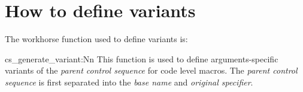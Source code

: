 \section{How to define variants}

The workhorse function used to define variants is:

\begin{docCommand}{cs_generate_variant:Nn} {  }
This function is used to define arguments-specific variants of the \emph{parent control sequence} for  
code level macros. The \emph{parent control sequence} is first separated into the \emph{base name} and \emph{original specifier}. 
\end{docCommand}







 
